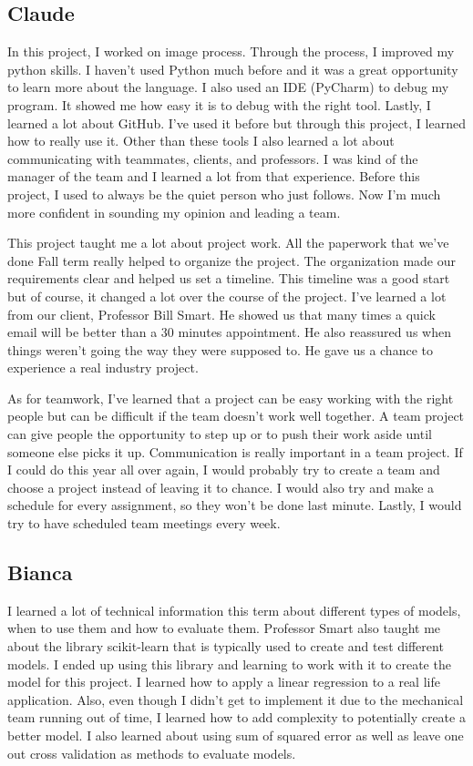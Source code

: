 \documentclass[onecolumn, draftclsnofoot,10pt, compsoc]{IEEEtran}
\begin{document}
	\subsection{Claude}
	In this project, I worked on image process. Through the process, I improved my python skills. I haven't used Python much before and it was a great opportunity to learn more about the language. I also used an IDE (PyCharm) to debug my program. It showed me how easy it is to debug with the right tool. Lastly, I learned a lot about GitHub. I've used it before but through this project, I learned how to really use it. Other than these tools I also learned a lot about communicating with teammates, clients, and professors. I was kind of the manager of the team and I learned a lot from that experience. Before this project, I used to always be the quiet person who just follows. Now I'm much more confident in sounding my opinion and leading a team.  
	
	This project taught me a lot about project work. All the paperwork that we've done Fall term really helped to organize the project. The organization made our requirements clear and helped us set a timeline. This timeline was a good start but of course, it changed a lot over the course of the project. I've learned a lot from our client, Professor Bill Smart. He showed us that many times a quick email will be better than a 30 minutes appointment. He also reassured us when things weren't going the way they were supposed to. He gave us a chance to experience a real industry project. 
	
	As for teamwork, I've learned that a project can be easy working with the right people but can be difficult if the team doesn't work well together.  A team project can give people the opportunity to step up or to push their work aside until someone else picks it up. Communication is really important in a team project. If I could do this year all over again, I would probably try to create a team and choose a project instead of leaving it to chance. I would also try and make a schedule for every assignment, so they won't be done last minute. Lastly, I would try to have scheduled team meetings every week.
	
	
	\subsection{Bianca}
	
I learned a lot of technical information this term about different types of models, when to use them and how to evaluate them. Professor Smart also taught me about the library scikit-learn that is typically used to create and test different models. I ended up using this library and learning to work with it to create the model for this project. I learned how to apply a linear regression to a real life application. Also, even though I didn't get to implement it due to the mechanical team running out of time, I learned how to add complexity to potentially create a better model. I also learned about using sum of squared error as well as leave one out cross validation as methods to evaluate models. 
\end{document}

